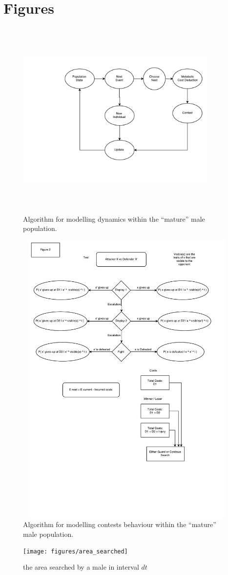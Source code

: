 \documentclass[a4paper,11pt]{article}
\begin{document}
\section{Figures}

\begin{figure}[h!]
\centering
\includegraphics[width=10cm,height=10cm,keepaspectratio]{figures/event_algorithm}
\caption{Algorithm for modelling dynamics within the ``mature'' male population.}
\label{fig:events}
\end{figure}
\clearpage

\begin{figure}[h!]
\centering
\includegraphics[width=15cm,height=15cm,keepaspectratio]{figures/contest_algorithm}
\caption{Algorithm for modelling contests behaviour within the ``mature'' male population.}
\label{fig:contests}
\end{figure}
\clearpage

\begin{figure}[h!]
\centering
\texttt{[image: figures/area\_searched]}
\caption{the area searched by a male in interval $dt$}
\label{fig:area searched}
\end{figure}
\clearpage


\end{document}
